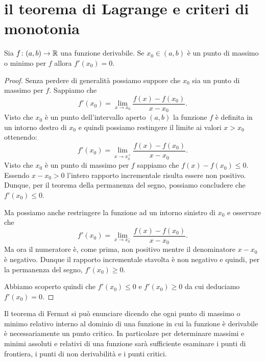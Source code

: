 \section{il teorema di Lagrange e criteri di monotonia}

\begin{theorem}[Fermat]
\mymark{***}
Sia $f\colon (a,b)\to {\mathbb R}$ una funzione derivabile.
Se $x_0\in (a,b)$ è un punto di massimo o minimo per $f$ allora
$f'(x_0)=0$.
\end{theorem}
%
\begin{proof}
\mymark{***}
Senza perdere di generalità possiamo suppore che $x_0$ sia un punto di massimo per $f$.
Sappiamo che
\[
  f'(x_0) = \lim_{x\to x_0}\frac{f(x)-f(x_0)}{x-x_0}.
\]
Visto che $x_0$ è un punto dell'intervallo aperto $(a,b)$ la funzione $f$ è definita in un intorno destro di $x_0$ e quindi possiamo restingere il limite ai valori $x>x_0$ ottenendo:
\[
  f'(x_0) = \lim_{x\to x_0^+}\frac{f(x) - f(x_0)}{x-x_0}.
\]
Visto che $x_0$ è un punto di massimo per $f$ sappiamo che $f(x)-f(x_0)\le 0$. Essendo $x-x_0>0$ l'intero rapporto incrementale risulta essere non positivo.
Dunque, per il teorema della permanenza del segno,
possiamo concludere che $f'(x_0)\le 0$.

Ma possiamo anche restringere la funzione ad un intorno sinistro di $x_0$ e osservare che
\[
  f'(x_0) = \lim_{x\to x_0^-}\frac{f(x)-f(x_0)}{x-x_0}.
\]
Ma ora il numeratore è, come prima, non positivo mentre il denominatore $x-x_0$ è negativo. Dunque il rapporto incrementale stavolta è non negativo e quindi, per la permanenza del segno, $f'(x_0) \ge 0$.

Abbiamo scoperto quindi che $f'(x_0)\le 0$ e $f'(x_0)\ge 0$
da cui deduciamo $f'(x_0)=0$.
\end{proof}

Il teorema di Fermat si può
enunciare dicendo che ogni punto di massimo o minimo relativo interno
al dominio di una funzione in cui la funzione è derivabile
è necessariamente un punto critico.
In particolare per determinare massimi e minimi assoluti e relativi
di una funzione sarà sufficiente esaminare i punti di frontiera,
i punti di non derivabilità e i punti critici.

